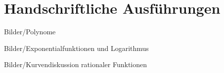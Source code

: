 \section{Handschriftliche Ausführungen}
\label{sec:Polynome_10} %
%
{Bilder/Polynome}

\label{sec:Exponentialfunktionen und Logarithmus} %
%
{Bilder/Exponentialfunktionen und Logarithmus}

\label{sec:Beispiel Kurvendiskussion} %
%
{Bilder/Kurvendiskussion rationaler Funktionen}